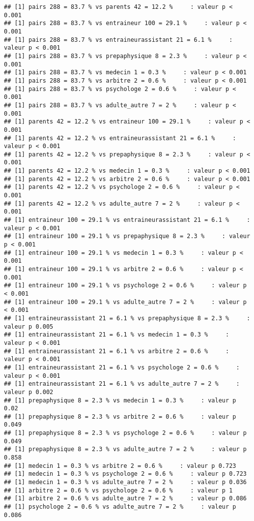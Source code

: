 \documentclass[
]{article}
\begin{document}
\begin{verbatim}
## [1] pairs 288 = 83.7 % vs parents 42 = 12.2 %     : valeur p < 0.001
## [1] pairs 288 = 83.7 % vs entraineur 100 = 29.1 %     : valeur p < 0.001
## [1] pairs 288 = 83.7 % vs entraineurassistant 21 = 6.1 %     : valeur p < 0.001
## [1] pairs 288 = 83.7 % vs prepaphysique 8 = 2.3 %     : valeur p < 0.001
## [1] pairs 288 = 83.7 % vs medecin 1 = 0.3 %     : valeur p < 0.001
## [1] pairs 288 = 83.7 % vs arbitre 2 = 0.6 %     : valeur p < 0.001
## [1] pairs 288 = 83.7 % vs psychologe 2 = 0.6 %     : valeur p < 0.001
## [1] pairs 288 = 83.7 % vs adulte_autre 7 = 2 %     : valeur p < 0.001
## [1] parents 42 = 12.2 % vs entraineur 100 = 29.1 %     : valeur p < 0.001
## [1] parents 42 = 12.2 % vs entraineurassistant 21 = 6.1 %     : valeur p < 0.001
## [1] parents 42 = 12.2 % vs prepaphysique 8 = 2.3 %     : valeur p < 0.001
## [1] parents 42 = 12.2 % vs medecin 1 = 0.3 %     : valeur p < 0.001
## [1] parents 42 = 12.2 % vs arbitre 2 = 0.6 %     : valeur p < 0.001
## [1] parents 42 = 12.2 % vs psychologe 2 = 0.6 %     : valeur p < 0.001
## [1] parents 42 = 12.2 % vs adulte_autre 7 = 2 %     : valeur p < 0.001
## [1] entraineur 100 = 29.1 % vs entraineurassistant 21 = 6.1 %     : valeur p < 0.001
## [1] entraineur 100 = 29.1 % vs prepaphysique 8 = 2.3 %     : valeur p < 0.001
## [1] entraineur 100 = 29.1 % vs medecin 1 = 0.3 %     : valeur p < 0.001
## [1] entraineur 100 = 29.1 % vs arbitre 2 = 0.6 %     : valeur p < 0.001
## [1] entraineur 100 = 29.1 % vs psychologe 2 = 0.6 %     : valeur p < 0.001
## [1] entraineur 100 = 29.1 % vs adulte_autre 7 = 2 %     : valeur p < 0.001
## [1] entraineurassistant 21 = 6.1 % vs prepaphysique 8 = 2.3 %     : valeur p 0.005
## [1] entraineurassistant 21 = 6.1 % vs medecin 1 = 0.3 %     : valeur p < 0.001
## [1] entraineurassistant 21 = 6.1 % vs arbitre 2 = 0.6 %     : valeur p < 0.001
## [1] entraineurassistant 21 = 6.1 % vs psychologe 2 = 0.6 %     : valeur p < 0.001
## [1] entraineurassistant 21 = 6.1 % vs adulte_autre 7 = 2 %     : valeur p 0.002
## [1] prepaphysique 8 = 2.3 % vs medecin 1 = 0.3 %     : valeur p 0.02
## [1] prepaphysique 8 = 2.3 % vs arbitre 2 = 0.6 %     : valeur p 0.049
## [1] prepaphysique 8 = 2.3 % vs psychologe 2 = 0.6 %     : valeur p 0.049
## [1] prepaphysique 8 = 2.3 % vs adulte_autre 7 = 2 %     : valeur p 0.858
## [1] medecin 1 = 0.3 % vs arbitre 2 = 0.6 %     : valeur p 0.723
## [1] medecin 1 = 0.3 % vs psychologe 2 = 0.6 %     : valeur p 0.723
## [1] medecin 1 = 0.3 % vs adulte_autre 7 = 2 %     : valeur p 0.036
## [1] arbitre 2 = 0.6 % vs psychologe 2 = 0.6 %     : valeur p 1
## [1] arbitre 2 = 0.6 % vs adulte_autre 7 = 2 %     : valeur p 0.086
## [1] psychologe 2 = 0.6 % vs adulte_autre 7 = 2 %     : valeur p 0.086
\end{verbatim}
\end{document}
